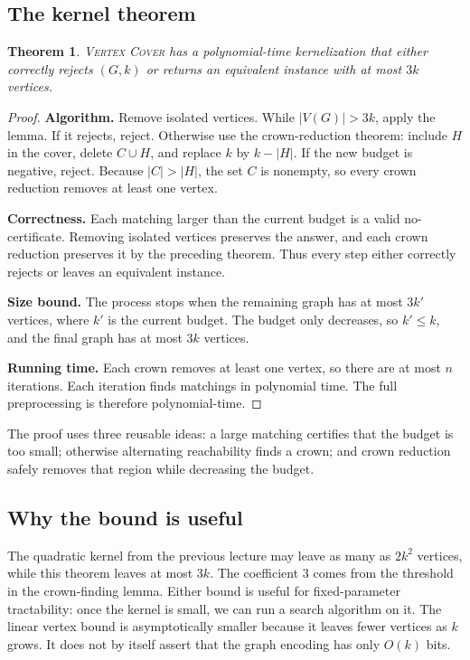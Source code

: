 \documentclass[11pt]{article}
\newtheorem{theorem}{Theorem}[section]
\newcommand{\VC}{\textsc{Vertex Cover}}
\begin{document}
\subsection{The kernel theorem}

\begin{theorem}
\VC{} has a polynomial-time kernelization that either correctly rejects $(G,k)$ or returns an equivalent instance with at most $3k$ vertices.
\end{theorem}
\begin{proof}
\textbf{Algorithm.} Remove isolated vertices. While $|V(G)|>3k$, apply the lemma. If it rejects, reject. Otherwise use the crown-reduction theorem: include $H$ in the cover, delete $C\cup H$, and replace $k$ by $k-|H|$. If the new budget is negative, reject. Because $|C|>|H|$, the set $C$ is nonempty, so every crown reduction removes at least one vertex.

\textbf{Correctness.} Each matching larger than the current budget is a valid no-certificate. Removing isolated vertices preserves the answer, and each crown reduction preserves it by the preceding theorem. Thus every step either correctly rejects or leaves an equivalent instance.

\textbf{Size bound.} The process stops when the remaining graph has at most $3k'$ vertices, where $k'$ is the current budget. The budget only decreases, so $k'\leq k$, and the final graph has at most $3k$ vertices.

\textbf{Running time.} Each crown removes at least one vertex, so there are at most $n$ iterations. Each iteration finds matchings in polynomial time. The full preprocessing is therefore polynomial-time.
\end{proof}

The proof uses three reusable ideas: a large matching certifies that the budget is too small; otherwise alternating reachability finds a crown; and crown reduction safely removes that region while decreasing the budget.

\subsection{Why the bound is useful}

The quadratic kernel from the previous lecture may leave as many as $2k^2$ vertices, while this theorem leaves at most $3k$. The coefficient 3 comes from the threshold in the crown-finding lemma. Either bound is useful for fixed-parameter tractability: once the kernel is small, we can run a search algorithm on it. The linear vertex bound is asymptotically smaller because it leaves fewer vertices as $k$ grows. It does not by itself assert that the graph encoding has only $O(k)$ bits.
\end{document}
